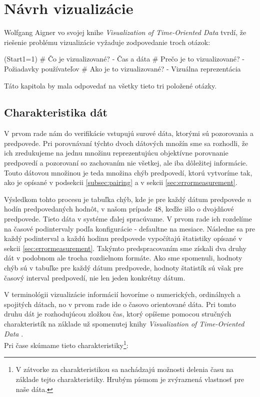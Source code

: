 \chapter{Návrh vizualizácie}
\label{chap:design}
Wolfgang Aigner vo svojej knihe \textit{Visualization of Time-Oriented Data} \cite{TimeOrientedData} tvrdí, že riešenie problému vizualizácie vyžaduje zodpovedanie troch otázok: 
\begin{easylist}
	\ListProperties(Start1=1)	
	# Čo je vizualizované? - Čas a dáta
	# Prečo je to vizualizované? - Požiadavky používateľov
	# Ako je to vizualizované? - Vizuálna reprezentácia \\
\end{easylist}
\noindent Táto kapitola by mala odpovedať na všetky tieto tri položené otázky. 

\section{Charakteristika dát}
V prvom rade nám do verifikácie vstupujú surové dáta, ktorými sú pozorovania a predpovede. Pri porovnávaní týchto dvoch dátových množín sme sa rozhodli, že ich zredukujeme na jednu množinu reprezentujúcu objektívne porovnanie predpovedí a pozorovaní so zachovaním nie všetkej, ale iba dôležitej informácie. Touto dátovou množinou je teda množina chýb predpovedí, ktorú vytvoríme tak, ako je opísané v podsekcii \ref{subsec:pairing} a v sekcii \ref{sec:errormeasurement}.

Výsledkom tohto procesu je tabuľka chýb, kde je pre každý dátum predpovede $ n $ hodín predpovedaných hodnôt, v našom prípade 48, keďže išlo o dvojdňové predpovede. Tieto dáta v systéme ďalej spracúvame. V prvom rade ich rozdelíme na časové podintervaly podľa konfigurácie - defaultne na mesiace. Následne sa pre každý podinterval a každú hodinu predpovede vypočítajú štatistiky opísané v sekcii \ref{sec:errormeasurement}. Takýmto predspracovaním sme získali dva druhy dát v podobnom ale trocha rozdielnom formáte. Ako sme spomenuli, hodnoty chýb sú v tabuľke pre každý dátum predpovede, hodnoty štatistík sú však pre časový interval predpovedí, nie len jeden konkrétny dátum.

V terminológii vizualizácie informácií hovoríme o numerických, ordinálnych a spojitých dátach, no v prvom rade ide o časovo orientované dáta. Pri tomto druhu dát je rozhodujúcou zložkou čas, ktorý opíšeme pomocou stručných charakteristík na základe už spomenutej knihy \textit{Visualization of Time-Oriented Data} \cite{TimeOrientedData}. \\
Pri čase skúmame tieto charakteristiky\footnote{V zátvorke za charakteristikou sa nachádzajú možnosti delenia času na základe tejto charakteristiky. Hrubým písmom je zvýraznená vlastnosť pre naše dáta.}: 

